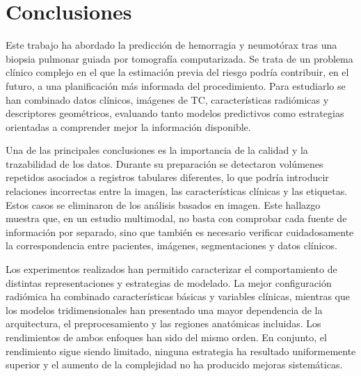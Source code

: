 \chapter{Conclusiones}\label{chap:conclusiones}


Este trabajo ha abordado la predicción de hemorragia y neumotórax tras una biopsia pulmonar guiada por tomografía computarizada. Se trata de un problema clínico complejo en el que la estimación previa del riesgo podría contribuir, en el futuro, a una planificación más informada del procedimiento. Para estudiarlo se han combinado datos clínicos, imágenes de TC, características radiómicas y descriptores geométricos, evaluando tanto modelos predictivos como estrategias orientadas a comprender mejor la información disponible.

Una de las principales conclusiones es la importancia de la calidad y la trazabilidad de los datos. Durante su preparación se detectaron volúmenes repetidos asociados a registros tabulares diferentes, lo que podría introducir relaciones incorrectas entre la imagen, las características clínicas y las etiquetas. Estos casos se eliminaron de los análisis basados en imagen. Este hallazgo muestra que, en un estudio multimodal, no basta con comprobar cada fuente de información por separado, sino que también es necesario verificar cuidadosamente la correspondencia entre pacientes, imágenes, segmentaciones y datos clínicos.

Los experimentos realizados han permitido caracterizar el comportamiento de distintas representaciones y estrategias de modelado. La mejor configuración radiómica ha combinado características básicas y variables clínicas, mientras que los modelos tridimensionales han presentado una mayor dependencia de la arquitectura, el preprocesamiento y las regiones anatómicas incluidas. Los rendimientos de ambos enfoques han sido del mismo orden. En conjunto, el rendimiento sigue siendo limitado, ninguna estrategia ha resultado uniformemente superior y el aumento de la complejidad no ha producido mejoras sistemáticas.

